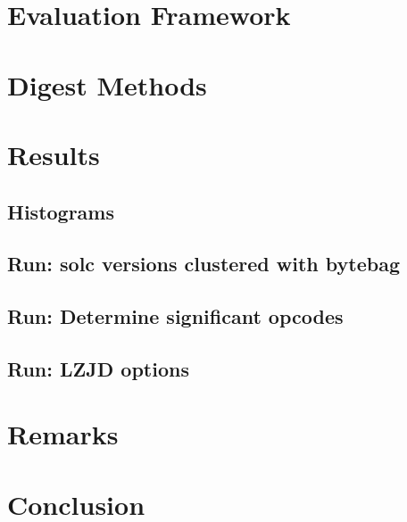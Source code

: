 \documentclass[]{article}
\begin{document}
\section{Evaluation Framework}


\section{Digest Methods}


\section{Results}
\subsection{Histograms}


\subsection{Run: solc versions clustered with bytebag}


\subsection{Run: Determine significant opcodes}


\subsection{Run: LZJD options}


\section{Remarks}


\section{Conclusion}


\printbibliography
\end{document}
